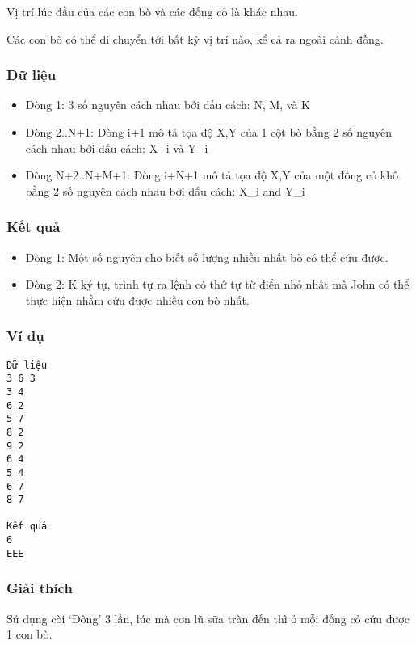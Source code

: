    Vị trí lúc đầu của các con bò và các đống cỏ là khác nhau.  

   Các con bò có thể di chuyển tới bất kỳ vị trí nào, kể cả ra ngoài cánh đồng.  

\subsubsection{   Dữ liệu  }
\begin{itemize}
	\item     Dòng 1: 3 số nguyên cách nhau bởi dấu cách: N, M, và K   
	\item     Dòng 2..N+1: Dòng i+1 mô tả tọa độ X,Y của 1 cột bò         bằng 2 số nguyên cách nhau bởi dấu cách: X\_i và Y\_i   
	\item     Dòng N+2..N+M+1: Dòng i+N+1 mô tả tọa độ X,Y của một         đống cỏ khô bằng 2 số nguyên cách nhau bởi dấu cách: X\_i and Y\_i   
\end{itemize}

\subsubsection{   Kết quả  }
\begin{itemize}
	\item     Dòng 1: Một số nguyên cho biết số lượng nhiều nhất bò có thể cứu được.   
	\item     Dòng 2: K ký tự, trình tự ra lệnh có thứ tự từ điển nhỏ nhất mà John có thể thực hiện nhằm cứu được nhiều con bò nhất.   
\end{itemize}

\subsubsection{   Ví dụ  }
\begin{verbatim}
Dữ liệu
3 6 3
3 4
6 2
5 7
8 2
9 2
6 4
5 4
6 7
8 7

Kết quả
6
EEE
\end{verbatim}

\subsubsection{   Giải thích  }

   Sử dụng còi ‘Đông’ 3 lần, lúc mà cơn lũ sữa tràn đến  thì ở mỗi đống cỏ cứu được 1 con bò.  